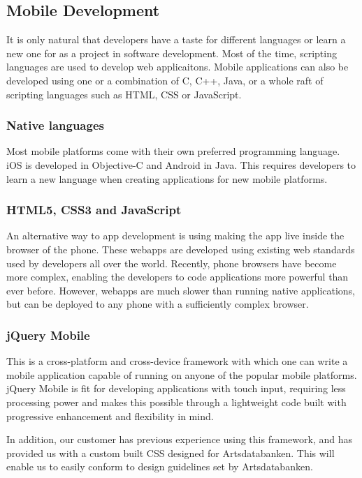 \subsection{Mobile Development}
It is only natural that developers have a taste for different languages or
learn a new one for as a project in software development. Most of the time,
scripting languages are used to develop web applicaitons. Mobile applications
can also be developed using one or a combination of C, C++, Java, or a whole raft of scripting languages such as HTML, CSS or JavaScript.

\subsubsection{Native languages}
Most mobile platforms come with their own preferred programming language. iOS is developed in Objective-C and Android in Java. This requires developers to learn a new language when creating applications for new mobile platforms.

\subsubsection{HTML5, CSS3 and JavaScript}
An alternative way to app development is using making the app live inside the browser of the phone. These webapps are developed using existing web standards used by developers all over the world. Recently, phone browsers have become more complex, enabling the developers to code applications more powerful than ever before. However, webapps are much slower than running native applications, but can be deployed to any phone with a sufficiently complex browser.

\subsubsection{jQuery Mobile}
This is a cross-platform and cross-device framework with which one can write
a mobile application capable of running on anyone of the popular mobile platforms.
jQuery Mobile is fit for developing applications with touch input, requiring
less processing power and  makes this possible through a lightweight code
built with progressive enhancement and flexibility in mind.

In addition, our customer has previous experience using this framework, and has provided us with a custom built CSS designed for Artsdatabanken. This will enable us to easily conform to design guidelines set by Artsdatabanken.

